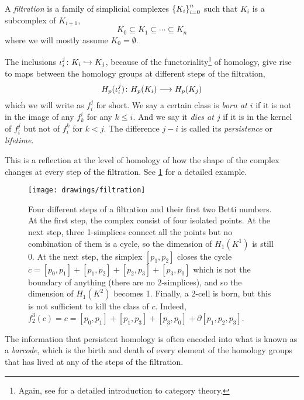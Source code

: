 \documentclass[../main.tex]{subfiles}
\begin{document}
\begin{definition}[Filtration]
	A \emph{filtration} is a family of simplicial complexes \( \left\{ K_i \right\}_{i = 0}^n \)	such
	that \( K_i \) is a subcomplex of \( K_{i+1} \),
	\begin{equation*}
		K_0 \subseteq K_1 \subseteq \cdots \subseteq K_n
	\end{equation*}
	where we will mostly assume \( K_0 = \emptyset \). 
\end{definition}
The inclusions \( \iota_i^j \colon K_i \hookrightarrow K_j \), because of the
functoriality\footnote{Again, see \cite{riehl} for a detailed introduction to category
theory.} of homology, give rise to maps between the homology groups at different steps of
the filtration,
\begin{equation*}
	H_p(\iota_i^j) \colon H_p(K_i) \longrightarrow H_p(K_j)
\end{equation*}
which we will write as \( f_i^j \) for short. We say a certain class is \emph{born at \( i
\)} if it is not in the image of any \( f_k^i \) for any \( k \leq i \). And we say it
\emph{dies at \( j \)} if it is in the kernel of \( f_i^j \) but not of \( f_i^k \) for \(
k < j \). The difference \( j - i \) is called its \emph{persistence} or \emph{lifetime}. 

This is a reflection at the level of homology of how the shape of the complex changes at
every step of the filtration. See \cref{fig:filtration} for a detailed example.
\begin{figure}[htb]
	\centering
	\texttt{[image: drawings/filtration]}
	\caption{Four different steps of a filtration and their first two Betti numbers. At the
		first step, the complex consist of four isolated points. At the next step, three
		1-simplices connect all the points but no combination of them is a cycle, so the dimension
		of \( H_1(K^1) \) is still 0. At the next step, the simplex \( [p_1,p_2] \) closes the
		cycle \( c = [p_0,p_1] + [p_1,p_2] + [p_2,p_3] + [p_3,p_0] \)	which is not the boundary of
		anything (there are no 2-simplices), and so the dimension of \( H_1(K^2) \) becomes 1.
		Finally, a 2-cell is born, but this is not sufficient to kill the class of \( c \).
	Indeed, \( f_2^3(c) = c = [p_0,p_1] + [p_1,p_3] + [p_3,p_0] + \partial[p_1,p_2,p_3] \).}
	\label{fig:filtration}
\end{figure}
The information that persistent homology is often encoded into what is known as a
\emph{barcode}, which is the birth and death of every element of the homology groups that
has lived at any of the steps of the filtration. 
\end{document}
